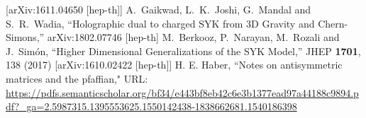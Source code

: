 \begin{thebibliography}{99}
  [arXiv:1611.04650 [hep-th]]
	A.~Gaikwad, L.~K.~Joshi, G.~Mandal and S.~R.~Wadia,
  ``Holographic dual to charged SYK from 3D Gravity and Chern-Simons,''
  arXiv:1802.07746 [hep-th]
	M.~Berkooz, P.~Narayan, M.~Rozali and J.~Simón,
  ``Higher Dimensional Generalizations of the SYK Model,''
  JHEP {\bf 1701}, 138 (2017)
  [arXiv:1610.02422 [hep-th]]
	H. E. Haber,
	``Notes on antisymmetric matrices and the pfaffian,"
	URL: \url{https://pdfs.semanticscholar.org/bf34/e443bf8eb42c6e3b1377ead97a44188c9894.pdf?_ga=2.5987315.1395553625.1550142438-1838662681.1540186398}
\end{thebibliography}
